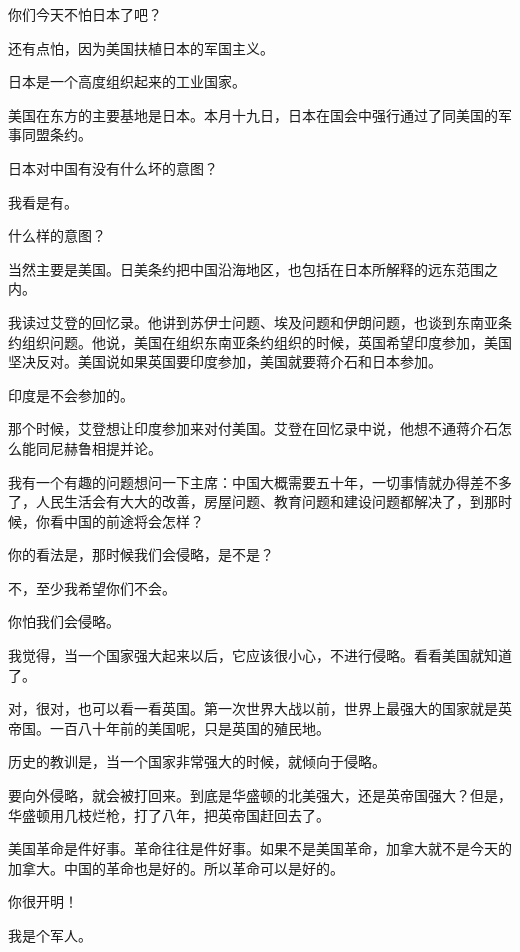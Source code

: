你们今天不怕日本了吧？

还有点怕，因为美国扶植日本的军国主义。

日本是一个高度组织起来的工业国家。

美国在东方的主要基地是日本。本月十九日，日本在国会中强行通过了同美国的军事同盟条约。

日本对中国有没有什么坏的意图？

我看是有。

什么样的意图？

当然主要是美国。日美条约把中国沿海地区，也包括在日本所解释的远东范围之内。

我读过艾登的回忆录。他讲到苏伊士问题、埃及问题和伊朗问题，也谈到东南亚条约组织问题。他说，美国在组织东南亚条约组织的时候，英国希望印度参加，美国坚决反对。美国说如果英国要印度参加，美国就要蒋介石和日本参加。

印度是不会参加的。

那个时候，艾登想让印度参加来对付美国。艾登在回忆录中说，他想不通蒋介石怎么能同尼赫鲁相提并论。

我有一个有趣的问题想问一下主席：中国大概需要五十年，一切事情就办得差不多了，人民生活会有大大的改善，房屋问题、教育问题和建设问题都解决了，到那时候，你看中国的前途将会怎样？

你的看法是，那时候我们会侵略，是不是？

不，至少我希望你们不会。

你怕我们会侵略。

我觉得，当一个国家强大起来以后，它应该很小心，不进行侵略。看看美国就知道了。

对，很对，也可以看一看英国。第一次世界大战以前，世界上最强大的国家就是英帝国。一百八十年前的美国呢，只是英国的殖民地。

历史的教训是，当一个国家非常强大的时候，就倾向于侵略。

要向外侵略，就会被打回来。到底是华盛顿的北美强大，还是英帝国强大？但是，华盛顿用几枝烂枪，打了八年，把英帝国赶回去了。

美国革命是件好事。革命往往是件好事。如果不是美国革命，加拿大就不是今天的加拿大。中国的革命也是好的。所以革命可以是好的。

你很开明！

我是个军人。

